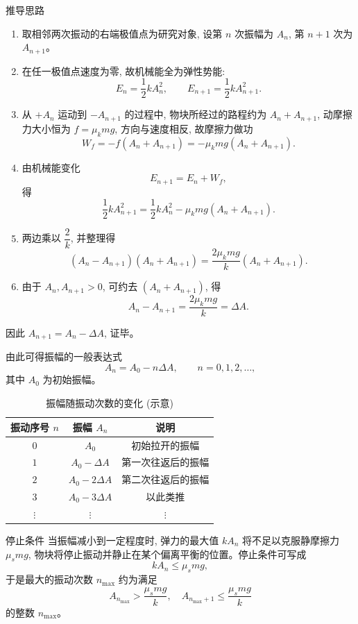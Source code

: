 \documentclass[a4paper,11pt]{ctexart}
\begin{document}
\begin{proofbox}{推导思路}
\begin{enumerate}
  \item 取相邻两次振动的右端极值点为研究对象, 设第 $n$ 次振幅为 $A_n$, 第 $n+1$ 次为 $A_{n+1}$。
  \item 在任一极值点速度为零, 故机械能全为弹性势能:
  \[
    E_n=\frac{1}{2}kA_n^2,\qquad E_{n+1}=\frac{1}{2}kA_{n+1}^2.
  \]
  \item 从 $+A_n$ 运动到 $-A_{n+1}$ 的过程中, 物块所经过的路程约为 $A_n+A_{n+1}$, 动摩擦力大小恒为 $f=\mu_k mg$, 方向与速度相反, 故摩擦力做功
  \[
    W_f = -f(A_n+A_{n+1})=-\mu_k mg(A_n+A_{n+1}).
  \]
  \item 由机械能变化
  \[
    E_{n+1}=E_n+W_f,
  \]
  得
  \[
    \frac{1}{2}kA_{n+1}^2=\frac{1}{2}kA_n^2-\mu_k mg(A_n+A_{n+1}).
  \]
  \item 两边乘以 $\dfrac{2}{k}$, 并整理得
  \[
    (A_n-A_{n+1})(A_n+A_{n+1})=\frac{2\mu_k mg}{k}(A_n+A_{n+1}).
  \]
  \item 由于 $A_n,A_{n+1}>0$, 可约去 $(A_n+A_{n+1})$, 得
  \[
    A_n-A_{n+1}=\dfrac{2\mu_k mg}{k}=\Delta A.
  \]
\end{enumerate}
因此 $A_{n+1}=A_n-\Delta A$, 证毕。
\end{proofbox}

由此可得振幅的一般表达式
\[
  A_n = A_0 - n\Delta A,\qquad n=0,1,2,\dots,
\]
其中 $A_0$ 为初始振幅。

\begin{table}[htbp]
  \centering
  \caption{振幅随振动次数的变化 (示意)}
  \label{tab:amplitude}
  \begin{tabular}{ccc}
    \hline
    振动序号 $n$ & 振幅 $A_n$ & 说明 \\
    \hline
    $0$ & $A_0$ & 初始拉开的振幅 \\
    $1$ & $A_0-\Delta A$ & 第一次往返后的振幅 \\
    $2$ & $A_0-2\Delta A$ & 第二次往返后的振幅 \\
    $3$ & $A_0-3\Delta A$ & 以此类推 \\
    $\vdots$ & $\vdots$ & $\vdots$ \\
    \hline
  \end{tabular}
\end{table}

\begin{notebox}{停止条件}
当振幅减小到一定程度时, 弹力的最大值 $kA_n$ 将不足以克服静摩擦力 $\mu_s mg$, 物块将停止振动并静止在某个偏离平衡的位置。停止条件可写成
\[
  kA_n \le \mu_s mg,
\]
于是最大的振动次数 $n_{\max}$ 约为满足
\[
  A_{n_{\max}} > \frac{\mu_s mg}{k},\quad 
  A_{n_{\max}+1} \le \frac{\mu_s mg}{k}
\]
的整数 $n_{\max}$。
\end{notebox}
\end{document}
